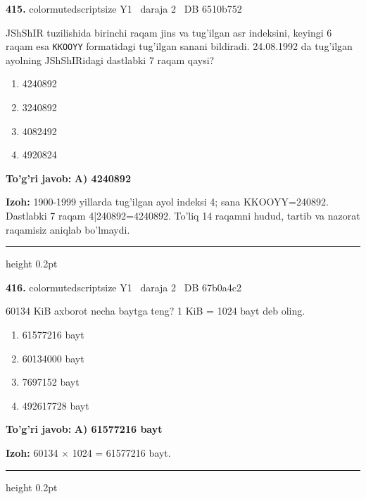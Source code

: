 \documentclass[10pt,a4paper,oneside]{article}
\begin{document}
\noindent\textbf{\color{ink}415.}  {color{muted}scriptsize Y1 \textbullet\ daraja 2 \textbullet\ DB 6510b752}
\par
JShShIR tuzilishida birinchi raqam jins va tug'ilgan asr indeksini, keyingi 6 raqam esa \texttt{KKOOYY} formatidagi tug'ilgan sanani bildiradi. 24.08.1992 da tug'ilgan ayolning JShShIRidagi dastlabki 7 raqam qaysi?
\begin{enumerate}[label=\Alph*),leftmargin=9mm]
\item 4240892
\item 3240892
\item 4082492
\item 4920824
\end{enumerate}
\begin{tcolorbox}[enhanced,breakable,colback=teal!4,colframe=teal!50!black,boxrule=0.5pt,arc=1.1mm,left=3mm,right=3mm,top=1.7mm,bottom=1.7mm,before skip=2mm,after skip=2mm]
\textbf{\color{teal}To'g'ri javob:} \textbf{A) 4240892}
\par\smallskip
\textbf{Izoh:} 1900-1999 yillarda tug'ilgan ayol indeksi 4; sana KKOOYY=240892. Dastlabki 7 raqam 4|240892=4240892. To'liq 14 raqamni hudud, tartib va nazorat raqamisiz aniqlab bo'lmaydi.
\end{tcolorbox}
\vspace{2mm}\hrule height 0.2pt \vspace{3mm}

\noindent\textbf{\color{ink}416.}  {color{muted}scriptsize Y1 \textbullet\ daraja 2 \textbullet\ DB 67b0a4c2}
\par
60134 KiB axborot necha baytga teng? 1 KiB = 1024 bayt deb oling.
\begin{enumerate}[label=\Alph*),leftmargin=9mm]
\item 61577216 bayt
\item 60134000 bayt
\item 7697152 bayt
\item 492617728 bayt
\end{enumerate}
\begin{tcolorbox}[enhanced,breakable,colback=teal!4,colframe=teal!50!black,boxrule=0.5pt,arc=1.1mm,left=3mm,right=3mm,top=1.7mm,bottom=1.7mm,before skip=2mm,after skip=2mm]
\textbf{\color{teal}To'g'ri javob:} \textbf{A) 61577216 bayt}
\par\smallskip
\textbf{Izoh:} 60134 \ensuremath{\times} 1024 = 61577216 bayt.
\end{tcolorbox}
\vspace{2mm}\hrule height 0.2pt \vspace{3mm}
\end{document}
